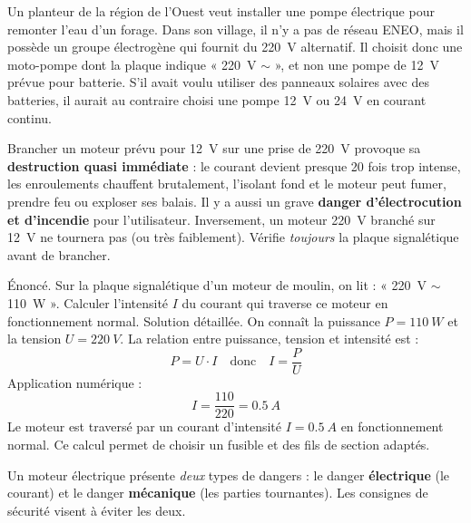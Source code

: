 \documentclass[11pt]{article}
\newcounter{popsec}
\newcounter{popsub}
\newcommand{\courssub}[1]{%
  \stepcounter{popsub}%
  \par\vspace{9pt}\noindent{\popxbold\fontsize{11.5}{13}\selectfont\color{popink}{\color{poporange}\thepopsec.\thepopsub}\hspace{6pt}#1}\par\nopagebreak\vspace{4pt}
}
\begin{document}
\begin{exemplebox}
Un planteur de la région de l'Ouest veut installer une pompe électrique pour remonter l'eau d'un forage. Dans son village, il n'y a pas de réseau ENEO, mais il possède un groupe électrogène qui fournit du \SI{220}{V} alternatif. Il choisit donc une moto-pompe dont la plaque indique « \SI{220}{V} $\sim$ », et non une pompe de \SI{12}{V} prévue pour batterie. S'il avait voulu utiliser des panneaux solaires avec des batteries, il aurait au contraire choisi une pompe \SI{12}{V} ou \SI{24}{V} en courant continu.
\end{exemplebox}

\begin{attention}
Brancher un moteur prévu pour \SI{12}{V} sur une prise de \SI{220}{V} provoque sa \textbf{destruction quasi immédiate} : le courant devient presque 20 fois trop intense, les enroulements chauffent brutalement, l'isolant fond et le moteur peut fumer, prendre feu ou exploser ses balais. Il y a aussi un grave \textbf{danger d'électrocution et d'incendie} pour l'utilisateur. Inversement, un moteur \SI{220}{V} branché sur \SI{12}{V} ne tournera pas (ou très faiblement). Vérifie \emph{toujours} la plaque signalétique avant de brancher.
\end{attention}

\begin{exoresolu}
Énoncé. Sur la plaque signalétique d'un moteur de moulin, on lit : « \SI{220}{V} $\sim$ \SI{110}{W} ». Calculer l'intensité $I$ du courant qui traverse ce moteur en fonctionnement normal.
\tcblower
Solution détaillée. On connaît la puissance $P = \SI{110}{W}$ et la tension $U = \SI{220}{V}$. La relation entre puissance, tension et intensité est :
\[ P = U \cdot I \quad \text{donc} \quad I = \frac{P}{U} \]
Application numérique :
\[ I = \frac{110}{220} = \SI{0,5}{A} \]
Le moteur est traversé par un courant d'intensité $I = \SI{0,5}{A}$ en fonctionnement normal. Ce calcul permet de choisir un fusible et des fils de section adaptés.
\end{exoresolu}

\courssub{Les consignes de sécurité}

Un moteur électrique présente \emph{deux} types de dangers : le danger \textbf{électrique} (le courant) et le danger \textbf{mécanique} (les parties tournantes). Les consignes de sécurité visent à éviter les deux.
\end{document}
